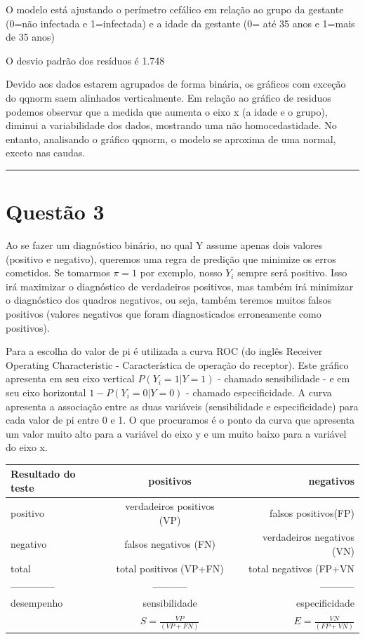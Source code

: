 \documentclass[11pt,]{article}
\begin{document}
O modelo está ajustando o perímetro cefálico em relação ao grupo da
gestante (0=não infectada e 1=infectada) e a idade da gestante (0= até
35 anos e 1=mais de 35 anos)

O desvio padrão dos resíduos é 1.748

Devido aos dados estarem agrupados de forma binária, os gráficos com
exceção do qqnorm saem alinhados verticalmente. Em relação ao gráfico de
residuos podemos observar que a medida que aumenta o eixo x (a idade e o
grupo), diminui a variabilidade dos dados, mostrando uma não
homocedastidade. No entanto, analisando o gráfico qqnorm, o modelo se
aproxima de uma normal, exceto nas caudas.

\begin{center}\rule{0.5\linewidth}{\linethickness}\end{center}

\section{Questão 3}\label{questao-3}

Ao se fazer um diagnóstico binário, no qual Y assume apenas dois valores
(positivo e negativo), queremos uma regra de predição que minimize os
erros cometidos. Se tomarmos \(\pi =1\) por exemplo, nosso \(Y_{i}\)
sempre será positivo. Isso irá maximizar o diagnóstico de verdadeiros
positivos, mas também irá minimizar o diagnóstico dos quadros negativos,
ou seja, também teremos muitos falsos positivos (valores negativos que
foram diagnosticados erroneamente como positivos).

Para a escolha do valor de pi é utilizada a curva ROC (do inglês
Receiver Operating Characteristic - Característica de operação do
receptor). Este gráfico apresenta em seu eixo vertical
\(P(Y_{i}=1|Y=1)\) - chamado sensibilidade - e em seu eixo horizontal
\(1-P(Y_{i}=0|Y=0)\) - chamado especificidade. A curva apresenta a
associação entre as duas variáveis (sensibilidade e especificidade) para
cada valor de pi entre 0 e 1. O que procuramos é o ponto da curva que
apresenta um valor muito alto para a variável do eixo y e um muito baixo
para a variável do eixo x.

\begin{longtable}[]{@{}lcr@{}}
\toprule
Resultado do teste & positivos & negativos\tabularnewline
\midrule
\endhead
positivo & verdadeiros positivos (VP) & falsos
positivos(FP)\tabularnewline
negativo & falsos negativos (FN) & verdadeiros negativos
(VN)\tabularnewline
total & total positivos (VP+FN) & total negativos (FP+VN\tabularnewline
-------------- & ----------- & -----------\tabularnewline
desempenho & sensibilidade & especificidade\tabularnewline
& \(S= \frac{VP}{(VP+FN)}\) & \(E= \frac{VN}{(FP+VN)}\)\tabularnewline
\bottomrule
\end{longtable}

\newpage
\singlespacing 

\end{document}
